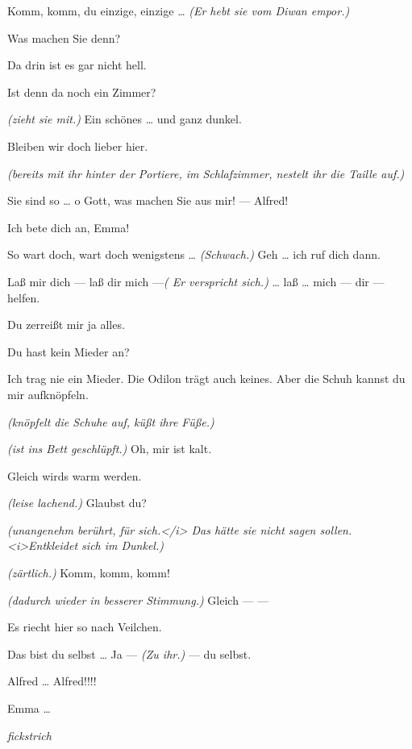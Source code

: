 \documentclass[
	final,
	a4paper,
	ngerman,
	mpinclude = true, %
	twoside = true,
	open = right,
	cleardoublepage = plain,
	DIV = 13,
	BCOR = 1cm,
	titlepage = firstiscover,
	]{scrbook}
\newcommand{\direction}[1]{\textit{(#1)}}
\newcommand{\hiat}{%
	\begin{center}
		\tiny
		\raisebox{0.5ex}{\rule{0.3\linewidth}{0.4pt}}
		\textit{fickstrich}
		\raisebox{0.5ex}{\rule{0.3\linewidth}{0.4pt}}
	\end{center}
}
\newcommand{\thecharacter}[1]{\textup{\textsc{#1}}\xspace}
\newcommand{\theherr}{\thecharacter{Junger Herr}}
\newcommand{\thefrau}{\thecharacter{Junge Frau}}
\newcommand{\character}[1]{\item[#1:]}
\newcommand{\herr}{\character{\theherr}}
\newcommand{\frau}{\character{\thefrau}}
\begin{document}
\begin{play}
	\herr
	Komm, komm, du einzige, einzige \ldots{} \direction{Er hebt sie vom Diwan empor.}

	\frau
	Was machen Sie denn?

	\herr
	Da drin ist es gar nicht hell.

	\frau
	Ist denn da noch ein Zimmer?

	\herr
	\direction{zieht sie mit.} Ein schönes \ldots{} und ganz dunkel.

	\frau
	Bleiben wir doch lieber hier.

	\herr
	\direction{bereits mit ihr hinter der Portiere, im Schlafzimmer, nestelt ihr die Taille auf.}

	\frau
	Sie sind so \ldots{} o Gott, was machen Sie aus mir! --- Alfred!

	\herr
	Ich bete dich an, Emma!

	\frau
	So wart doch, wart doch wenigstens \ldots{} \direction{Schwach.} Geh \ldots{} ich ruf dich dann.

	\herr
	Laß mir dich --- laß dir mich ---\direction{ Er verspricht sich.} \ldots{} laß \ldots{} mich --- dir --- helfen.

	\frau
	Du zerreißt mir ja alles.

	\herr
	Du hast kein Mieder an?

	\frau
	Ich trag nie ein Mieder. Die Odilon trägt auch keines. Aber die Schuh kannst du mir aufknöpfeln.

	\herr
	\direction{knöpfelt die Schuhe auf, küßt ihre Füße.}

	\frau
	\direction{ist ins Bett geschlüpft.} Oh, mir ist kalt.

	\herr
	Gleich wirds warm werden.

	\frau
	\direction{leise lachend.} Glaubst du?

	\herr
	\direction{unangenehm berührt, für sich.</i> Das hätte sie nicht sagen sollen. <i>Entkleidet sich im Dunkel.}

	\frau
	\direction{zärtlich.} Komm, komm, komm!

	\herr
	\direction{dadurch wieder in besserer Stimmung.} Gleich --- ---

	\frau
	Es riecht hier so nach Veilchen.

	\herr
	Das bist du selbst \ldots{} Ja --- \direction{Zu ihr.} --- du selbst.

	\frau
	Alfred \ldots{} Alfred!!!!

	\herr
	Emma \ldots{}

	\hiat


\end{play}
\end{document}
